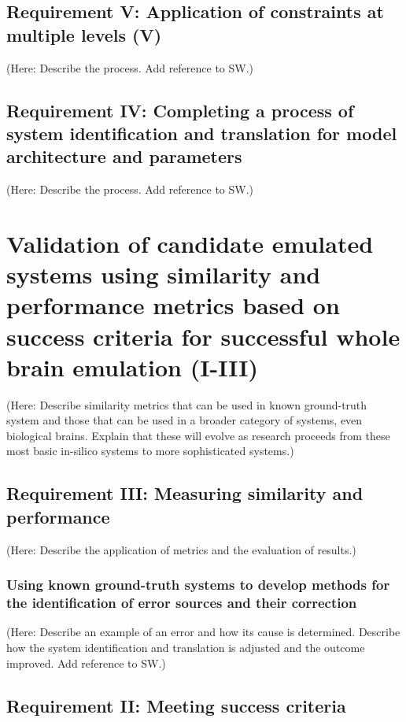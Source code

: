 \documentclass{ldr-article}
\begin{document}
\subsection{Requirement V: Application of constraints at multiple levels (V)}

(Here: Describe the process. Add reference to SW.)

\subsection{Requirement IV: Completing a process of system identification and translation for model architecture and parameters}

(Here: Describe the process. Add reference to SW.)

\section{Validation of candidate emulated systems using similarity and performance metrics based on success criteria for successful whole brain emulation (I-III)}

(Here: Describe similarity metrics that can be used in known ground-truth system and those that can be used in a broader category of systems, even biological brains. Explain that these will evolve as research proceeds from these most basic in-silico systems to more sophisticated systems.)

\subsection{Requirement III: Measuring similarity and performance}

(Here: Describe the application of metrics and the evaluation of results.)

\subsubsection{Using known ground-truth systems to develop methods for the identification of error sources and their correction}

(Here: Describe an example of an error and how its cause is determined. Describe how the system identification and translation is adjusted and the outcome improved. Add reference to SW.)

\subsection{Requirement II: Meeting success criteria}
\end{document}
